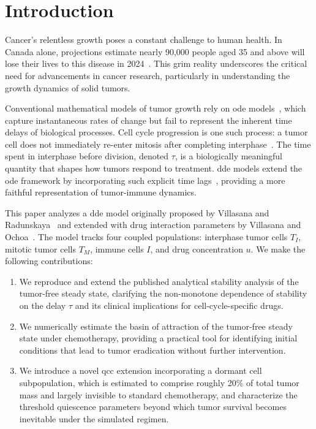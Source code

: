 \section{Introduction}
\label{sec:intro}

Cancer's relentless growth poses a constant challenge to human health. In Canada alone, projections estimate nearly 90,000 people aged 35 and above will lose their lives to this disease in 2024~\cite{pader_estimates_2021}. This grim reality underscores the critical need for advancements in cancer research, particularly in understanding the growth dynamics of solid tumors.

Conventional mathematical models of tumor growth rely on \gls{ode} models~\cite{butner_mathematical_2022}, which capture instantaneous rates of change but fail to represent the inherent time delays of biological processes. Cell cycle progression is one such process: a tumor cell does not immediately re-enter mitosis after completing interphase~\cite{alberts_molecular_2002}. The time spent in interphase before division, denoted $\tau$, is a biologically meaningful quantity that shapes how tumors respond to treatment. \gls{dde} models extend the \gls{ode} framework by incorporating such explicit time lags~\cite{busenberg_differential_1981, niculescu_stability_2021}, providing a more faithful representation of tumor-immune dynamics.

This paper analyzes a \gls{dde} model originally proposed by Villasana and Radunskaya~\cite{villasana_delay_2003} and extended with drug interaction parameters by Villasana and Ochoa~\cite{villasana_heuristic_2004}. The model tracks four coupled populations: interphase tumor cells $T_I$, mitotic tumor cells $T_M$, immune cells $I$, and drug concentration $u$. We make the following contributions:

\begin{enumerate}
  \item We reproduce and extend the published analytical stability analysis of the tumor-free steady state, clarifying the non-monotone dependence of stability on the delay $\tau$ and its clinical implications for cell-cycle-specific drugs.
  \item We numerically estimate the basin of attraction of the tumor-free steady state under chemotherapy, providing a practical tool for identifying initial conditions that lead to tumor eradication without further intervention.
  \item We introduce a novel \gls{qcc} extension incorporating a dormant cell
    subpopulation, which is estimated to comprise roughly 20\% of total tumor mass and largely invisible to standard chemotherapy, and characterize the threshold quiescence parameters beyond which tumor survival becomes inevitable under the simulated regimen.
\end{enumerate}

